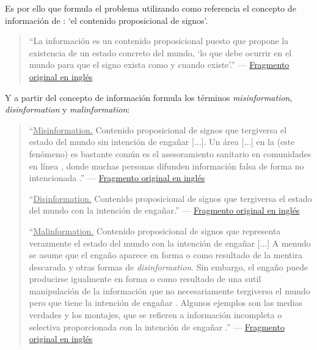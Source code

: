 Es por ello que \citet{Khan2021} formula el problema utilizando como referencia el concepto de información de \citet{Mingers2018}: `el contenido proposicional de signos'.

\label{frag4esp}
\begin{quotation}
    ``La información es un contenido proposicional puesto que propone la existencia de un estado concreto del mundo, `lo que debe ocurrir en el mundo para que el signo exista como y cuando existe'.'' --- \hyperref[frag4eng]{Fragmento original en inglés}
\end{quotation}

Y a partir del concepto de información formula los términos \emph{misinformation}, \emph{disinformation} y \emph{malinformation}:

\label{frag5esp}
\begin{quotation}
    ``\underline{Misinformation.} Contenido proposicional de signos que tergiversa el estado del mundo sin intención de engañar [...]. Un área [...] en la (este fenómeno) es bastante común es el asesoramiento sanitario en comunidades en línea \citep{Venkatesan2014}, donde muchas personas difunden información falsa de forma no intencionada \citep{Myers2009}.'' \citep{Khan2021} --- \hyperref[frag5eng]{Fragmento original en inglés} \\

\label{frag6esp}

    ``\underline{Disinformation.} Contenido proposicional de signos que tergiversa el estado del mundo con la intención de engañar.'' \citep{Khan2021} --- \hyperref[frag6eng]{Fragmento original en inglés} \\

\label{frag7esp}

    ``\underline{Malinformation.} Contenido proposicional de signos que representa verazmente el estado del mundo con la intención de engañar [...] A menudo se asume que el engaño aparece en forma o como resultado de la mentira descarada y otras formas de \emph{disinformation}. Sin embargo, el engaño puede producirse igualmente en forma o como resultado de una sutil manipulación de la información que no necesariamente tergiversa el mundo pero que tiene la intención de engañar \citep{McCornack2009,McCornack2014,Wardle2018a}. Algunos ejemplos son las medias verdades y los montajes, que se refieren a información incompleta o selectiva proporcionada con la intención de engañar \citep{Fallis2016}.'' \citep{Khan2021} --- \hyperref[frag7eng]{Fragmento original en inglés}
\end{quotation}

